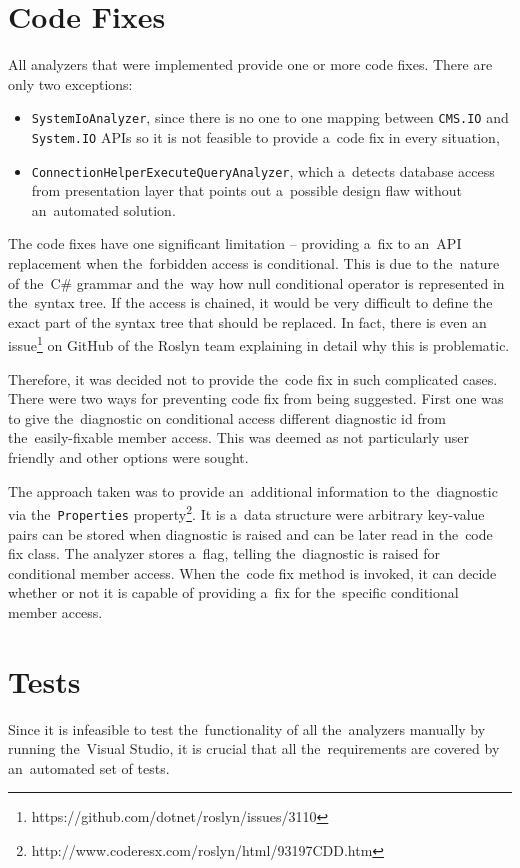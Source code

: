\documentclass[
  digital, %
  table,   %
  lof,     %
  lot,     %
  oneside,
]{fithesis3}
\begin{document}
\section{Code Fixes}
\label{sec:code-fixes}
All analyzers that were implemented provide one or more code fixes. There are only two exceptions:
\begin{itemize}
  \item \texttt{SystemIoAnalyzer}, since there is no one to one mapping between \texttt{CMS.IO} and \texttt{System.IO} APIs so it is not feasible to provide a~code fix in every situation,
  \item \texttt{ConnectionHelperExecuteQueryAnalyzer}, which a~detects database access from presentation layer that points out a~possible design flaw without an~automated solution.
\end{itemize} 

The code fixes have one significant limitation -- providing a~fix to an~API replacement when the~forbidden access is conditional. This is due to the~nature of the~C\# grammar and the~way how null conditional operator is represented in the~syntax tree. If the access is chained, it would be very difficult to define the exact part of the syntax tree that should be replaced. In fact, there is even an issue\footnote{https://github.com/dotnet/roslyn/issues/3110} on GitHub of the Roslyn team explaining in detail why this is problematic. 

Therefore, it was decided not to provide the~code fix in such complicated cases. There were two ways for preventing code fix from being suggested. First one was to give the~diagnostic on conditional access different diagnostic id from the~easily-fixable member access. This was deemed as not particularly user friendly and other options were sought.

The approach taken was to provide an~additional information to the~diagnostic via the~\texttt{Properties} property\footnote{http://www.coderesx.com/roslyn/html/93197CDD.htm}. It is a~data structure were arbitrary key-value pairs can be stored when diagnostic is raised and can be later read in the~code fix class. The analyzer stores a~flag, telling the~diagnostic is raised for conditional member access. When the~code fix method is invoked, it can decide whether or not it is capable of providing a~fix for the~specific conditional member access.

\section{Tests}
Since it is infeasible to test the~functionality of all the~analyzers manually by running the~Visual Studio, it is crucial that all the~requirements are covered by an~automated set of tests. 
\end{document}
